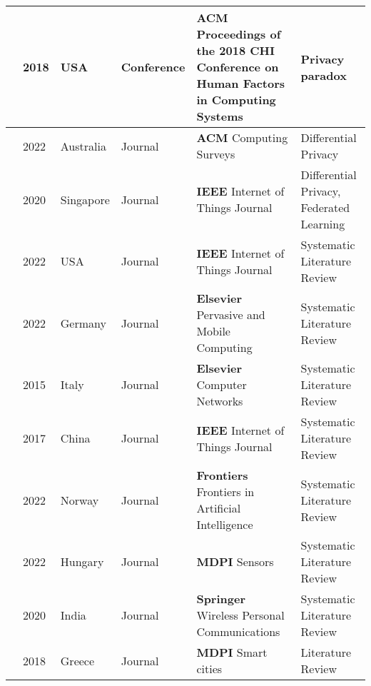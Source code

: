 \begin{footnotesize}
\begin{longtable}{p{1.2cm} p{1cm} p{1.6cm} p{3.2cm} p{5cm} p{3cm}}
        \cite{sannon2018privacy} & 2018 & USA & Conference & \textbf{ACM} Proceedings of the 2018 CHI Conference on Human Factors in Computing Systems & Privacy paradox \\
        \hline
        \cite{ZhaoSurvey} & 2022 & Australia & Journal & \textbf{ACM} Computing Surveys & Differential Privacy \\
        \hline
        \cite{zhao2020local} & 2020 & Singapore & Journal & \textbf{IEEE} Internet of Things Journal & Differential Privacy, Federated Learning \\
        \hline
        \cite{Gupta2022Privacy} & 2022 & USA & Journal & \textbf{IEEE} Internet of Things Journal & Systematic Literature Review \\
        \hline
        \cite{Kuhtreiber2022survey} & 2022 & Germany & Journal & \textbf{Elsevier} Pervasive and Mobile Computing & Systematic Literature Review \\
        \hline
        \cite{sicari2015security} & 2015 & Italy & Journal & \textbf{Elsevier} Computer Networks & Systematic Literature Review \\
        \hline
        \cite{LinSurvey} & 2017 & China & Journal & \textbf{IEEE} Internet of Things Journal & Systematic Literature Review \\
        \hline
        \cite{yang2022overview} & 2022 & Norway & Journal & \textbf{Frontiers} Frontiers in Artificial Intelligence & Systematic Literature Review \\
        \hline
        \cite{zubaydi2023leveraging} & 2022 & Hungary & Journal & \textbf{MDPI} Sensors & Systematic Literature Review \\
        \hline
        \cite{khanna2020internet} & 2020 & India & Journal & \textbf{Springer} Wireless Personal Communications & Systematic Literature Review \\
        \hline
        \cite{tzafestas2018ethics} & 2018 & Greece & Journal & \textbf{MDPI} Smart cities & Literature Review \\

\end{longtable}
\end{footnotesize}
